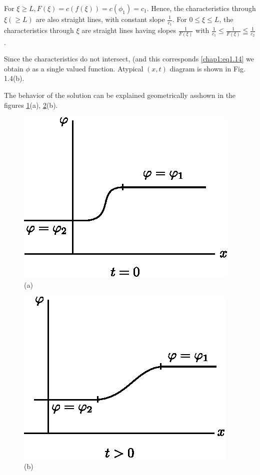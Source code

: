 For $\xi\geq L, F(\xi)=c(f(\xi))=c(\phi_1)=c_1$. Hence, the characteristics through $\xi(\geq L)$ are also straight lines, with constant slope $\frac{1}{c_1}$. For $0\leq\xi\leq L$, the characteristics through $\xi$ are straight lines having slopes $\frac{1}{F(\xi)}$ with $\frac{1}{c_1}\leq \frac{1}{F(\xi)}\leqq\frac{1}{c_2}$.

Since the characteristics do not intersect, (and this corresponds\break
\eqref{chap1:eq1.14} we obtain $\phi$ as a single valued
function. A\pageoriginale typical $(x,t)$ diagram is shown in
Fig. 1.4(b). 

The behavior of the solution can be explained geometrically as\break shown
in the figures \ref{chap1:fig1.3a}(a), \ref{chap1:fig1.3b}(b). 
\begin{center}
\begin{minipage}[b]{5cm}
\begin{figure}[H]
\centering
\includegraphics[scale=.9]{figures/fig61-1.3a.eps}
\caption{(a)}
\label{chap1:fig1.3a}
\end{figure}
\end{minipage}
\qquad
\begin{minipage}[b]{5cm}
\setcounter{figure}{2}
\begin{figure}[H]
\centering
\includegraphics[scale=.9]{figures/fig61-1.3b.eps}
\caption{(b)}
\label{chap1:fig1.3b}
\end{figure}
\end{minipage}
\end{center}

